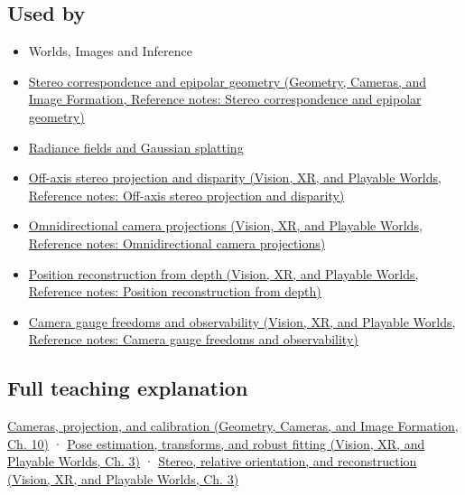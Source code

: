 \subsection{Used by}\label{appendix-3ee9861904d5-used-by}

\hypertarget{appendix-3ee9861904d5-used-by}{}

\begin{itemize}
\item
  {Worlds, Images and Inference}
\item
  \href{../03-Geometry-Cameras-and-Image-Formation/main.pdf\#nameddest=appendix-c4e98b6e4001}{Stereo correspondence and epipolar geometry (Geometry, Cameras, and Image Formation, Reference notes: Stereo correspondence and epipolar geometry)}
\item
  \hyperref[appendix-c5b332e400e7]{Radiance fields and Gaussian splatting}
\item
  \href{../07-Vision-XR-and-Playable-Worlds/main.pdf\#nameddest=appendix-0976e86e5b9f}{Off-axis stereo projection and disparity (Vision, XR, and Playable Worlds, Reference notes: Off-axis stereo projection and disparity)}
\item
  \href{../07-Vision-XR-and-Playable-Worlds/main.pdf\#nameddest=appendix-fc99ad39f351}{Omnidirectional camera projections (Vision, XR, and Playable Worlds, Reference notes: Omnidirectional camera projections)}
\item
  \href{../07-Vision-XR-and-Playable-Worlds/main.pdf\#nameddest=appendix-2cbf2968e866}{Position reconstruction from depth (Vision, XR, and Playable Worlds, Reference notes: Position reconstruction from depth)}
\item
  \href{../07-Vision-XR-and-Playable-Worlds/main.pdf\#nameddest=appendix-113f0267e5f4}{Camera gauge freedoms and observability (Vision, XR, and Playable Worlds, Reference notes: Camera gauge freedoms and observability)}
\end{itemize}

\subsection{Full teaching explanation}\label{appendix-3ee9861904d5-full-teaching-explanation}

\hypertarget{appendix-3ee9861904d5-full-teaching-explanation}{}

\href{../03-Geometry-Cameras-and-Image-Formation/main.pdf\#nameddest=03-visual-computing-i-ch003-cameras-projection-and-calibration}{Cameras, projection, and calibration (Geometry, Cameras, and Image Formation, Ch. 10)} · \href{../07-Vision-XR-and-Playable-Worlds/main.pdf\#nameddest=04-visual-computing-ii-ch032-pose-estimation-transforms-and-robust-fitting}{Pose estimation, transforms, and robust fitting (Vision, XR, and Playable Worlds, Ch. 3)} · \href{../07-Vision-XR-and-Playable-Worlds/main.pdf\#nameddest=04-visual-computing-ii-ch032-stereo-relative-orientation-and-reconstruction}{Stereo, relative orientation, and reconstruction (Vision, XR, and Playable Worlds, Ch. 3)}

